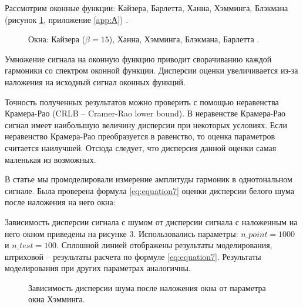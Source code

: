 Рассмотрим оконные функции: Кайзера, Барлетта, Ханна, Хэмминга, Блэкмана (рисунок \ref{img:Windows}, приложение \ref{app:А}) \cite{comparative_study2020,Increase_Accuracy_Yelizarov2014}. 

\begin{figure}[ht]
	\caption{Окна: Кайзера ($\beta=15$), Ханна, Хэмминга, Блэкмана, Барлетта .}\label{img:Windows}
\end{figure}
Умножение сигнала на оконную функцию приводит сворачиванию каждой гармоники со спектром оконной функции. Дисперсии оценки увеличивается из-за наложения на исходный сигнал оконных функций. 

Точность полученных результатов можно проверить с помощью неравенства Крамера-Рао (CRLB -- Cramer-Rao lower bound). В неравенстве Крамера-Рао сигнал имеет наибольшую величину дисперсии при некоторых условиях. Если неравенство Крамера-Рао преобразуется в равенство, то оценка параметров считается наилучшей. Отсюда следует, что дисперсия данной оценки самая маленькая из возможных.

В статье \cite{altman2020boundary} мы промоделировали измерение амплитуды гармоник в однотональном сигнале. Была проверена формула \ref{eq:equation7} оценки дисперсии белого шума после наложения на него окна:

Зависимость дисперсии сигнала с шумом от дисперсии сигнала с наложенным на него окном приведены на рисунке 3. Использовались параметры: $n\_point = 1000$ и $n\_test = 100$. Сплошной линией отображены результаты моделирования, штриховой -- результаты расчета по формуле \ref{eq:equation7}. Результаты моделирования при других параметрах аналогичны.


\begin{figure}[ht]
	\caption{Зависимость дисперсии шума после наложения окна от параметра окна Хэмминга.}\label{img:noise_win_var_hamming}
\end{figure}


